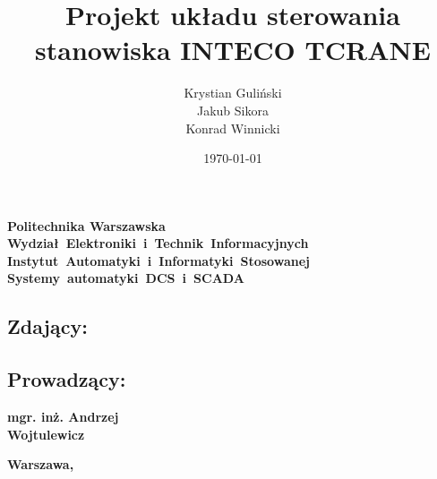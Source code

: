 \documentclass{mwrep}
\title{\bf Projekt układu sterowania stanowiska INTECO TCRANE \vskip 0.1cm}
\author{Krystian Guliński \\ Jakub Sikora \\ Konrad Winnicki }
\date{\today}
\begin{document}
\makeatletter
\renewcommand{\maketitle}{\begin{titlepage}
		\begin{center}{
				\LARGE {\bf Politechnika Warszawska}}\\
            \vspace{0.4cm}
            \leftskip-0.9cm
            {\LARGE {\bf \mbox{Wydział Elektroniki i Technik Informacyjnych}}}\\
            \vspace{0.2cm}
            {\LARGE {\bf \mbox{Instytut Automatyki i Informatyki Stosowanej}}}\\
            
            \vspace{5cm}
            \leftskip-1.5cm
			{\bf \Huge \mbox{Systemy automatyki DCS i SCADA} \vskip 0.1cm}
		\end{center}
		\vspace{0.1cm}

		\begin{center}
			{\bf \LARGE \@title}
		\end{center}

		\vspace{10cm}
		\begin{paracol}{2}
			\addtocontents{toc}{\protect\setcounter{tocdepth}{1}}
			\subsection*{Zdający:}
			\bf{ \Large{ \noindent\@author \par}}
			\addtocontents{toc}{\protect\setcounter{tocdepth}{2}}

			\switchcolumn \addtocontents{toc}{\protect\setcounter{tocdepth}{1}}
			\subsection*{Prowadzący:}
			\bf{\Large{\noindent mgr. inż. Andrzej \\ Wojtulewicz}}
			\addtocontents{toc}{\protect\setcounter{tocdepth}{2}}

		\end{paracol}
		\vspace*{\stretch{6}}
		\begin{center}
			\bf{\large{Warszawa, \@date\vskip 0.1cm}}
		\end{center}
	\end{titlepage}
}
\makeatother
\maketitle
\end{document}
